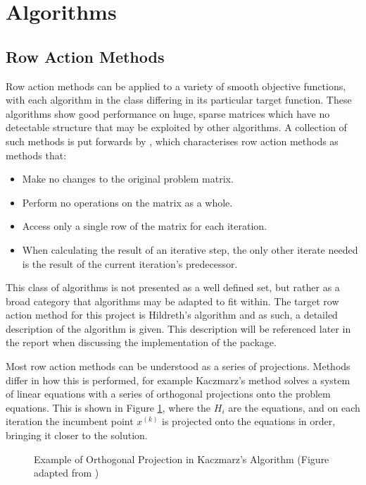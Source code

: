 \section{Algorithms}\label{sec:algorithms}
\subsection{Row Action Methods }\label{sub_row_action}
Row action methods can be applied to a variety of smooth objective functions, with each algorithm in the class differing in its particular target function. These algorithms show good performance on huge, sparse matrices which have no detectable structure that may be exploited by other algorithms. A collection of such methods is put forwards by \cite{ROW-ACTIONCENSORS}, which characterises row action methods as methods that:

\begin{itemize}
    \item Make no changes to the original problem matrix.
    \item Perform no operations on the matrix as a whole.
    \item Access only a single row of the matrix for each iteration.
    \item When calculating the result of an iterative step, the only other iterate needed is the result of the current iteration's predecessor.
\end{itemize}

This class of algorithms is not presented as a well defined set, but rather as a broad category that algorithms may be adapted to fit within. The target row action method for this project is Hildreth's algorithm and as such, a detailed description of the algorithm is given. This description will be referenced later in the report when discussing the implementation of the package.

Most row action methods can be understood as a series of projections. Methods differ in how this is performed, for example Kaczmarz's method \cite{Liu2014AnAlgorithm}\cite{S.Kaczmarz1937AngenaherteGleichungen} solves a system of linear equations with a series of orthogonal projections onto the problem equations. This is shown in Figure \ref{fig:kaczmarz}, where the $H_i$ are the equations, and on each iteration the incumbent point $x^{(k)}$ is projected onto the equations in order, bringing it closer to the solution.

\begin{figure}[thb]
    \centering
    
    \caption{Example of Orthogonal Projection in Kaczmarz's Algorithm (Figure adapted from \cite{ROW-ACTIONCENSORS})}
    \label{fig:kaczmarz}
\end{figure}




